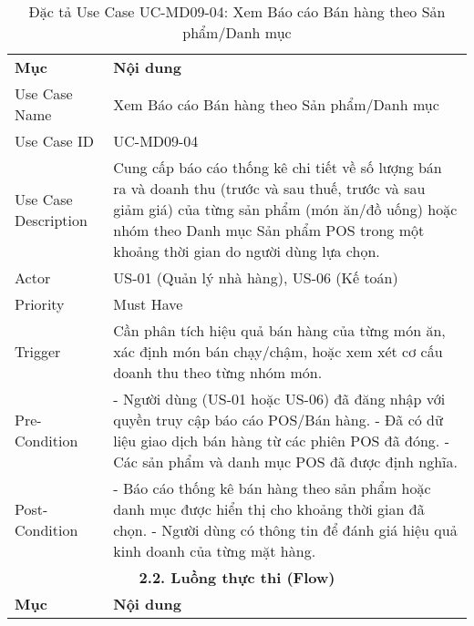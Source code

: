 \begin{longtable}{|m{4cm}|p{11cm}|}
\caption{Đặc tả Use Case UC-MD09-04: Xem Báo cáo Bán hàng theo Sản phẩm/Danh mục} \label{tab:uc_md09_04} \\
\hline

\endhead %
\hline
\endfoot %
\hline
\endlastfoot %
\multicolumn{2}{|c|}{\textbf{2.1. Tóm tắt (Summary)}} \\
\hline
\textbf{Mục} & \textbf{Nội dung} \\
\hline
Use Case Name & Xem Báo cáo Bán hàng theo Sản phẩm/Danh mục \\
\hline
Use Case ID & UC-MD09-04 \\
\hline
Use Case Description & Cung cấp báo cáo thống kê chi tiết về số lượng bán ra và doanh thu (trước và sau thuế, trước và sau giảm giá) của từng sản phẩm (món ăn/đồ uống) hoặc nhóm theo Danh mục Sản phẩm POS trong một khoảng thời gian do người dùng lựa chọn. \\
\hline
Actor & US-01 (Quản lý nhà hàng), US-06 (Kế toán) \\
\hline
Priority & Must Have \\
\hline
Trigger & Cần phân tích hiệu quả bán hàng của từng món ăn, xác định món bán chạy/chậm, hoặc xem xét cơ cấu doanh thu theo từng nhóm món. \\
\hline
Pre-Condition & - Người dùng (US-01 hoặc US-06) đã đăng nhập với quyền truy cập báo cáo POS/Bán hàng. \newline - Đã có dữ liệu giao dịch bán hàng từ các phiên POS đã đóng. \newline - Các sản phẩm và danh mục POS đã được định nghĩa. \\
\hline
Post-Condition & - Báo cáo thống kê bán hàng theo sản phẩm hoặc danh mục được hiển thị cho khoảng thời gian đã chọn. \newline - Người dùng có thông tin để đánh giá hiệu quả kinh doanh của từng mặt hàng. \\
\hline
\multicolumn{2}{|c|}{\textbf{2.2. Luồng thực thi (Flow)}} \\
\hline
\textbf{Mục} & \textbf{Nội dung} \\
\hline

\end{longtable}
